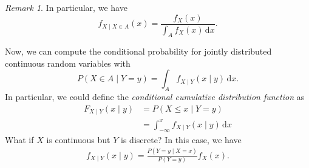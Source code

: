 \documentclass[math]{amznotes}
\theoremstyle{remark}
\newtheorem*{remark}{Remark}
\newcommand{\0}{\mathbf{0}}
\newcommand{\1}{\mathbf{1}}
\begin{document}
\begin{notebox}
    \begin{remark}
        In particular, we have
        \begin{equation*}
            f_{X \mid X \in A}(x) = \frac{f_X(x)}{\int_A\!f_X(x)\,\mathrm{d}x}.
        \end{equation*}
    \end{remark}
\end{notebox}
Now, we can compute the conditional probability for jointly distributed continuous random variables with
\begin{equation*}
    P(X \in A \mid Y = y) = \int_{A}\!f_{X \mid Y}(x \mid y)\,\mathrm{d}x.
\end{equation*}
In particular, we could define the \textit{conditional cumulative distribution function} as
\begin{align*}
    F_{X \mid Y}(x \mid y) & = P(X \leq x \mid Y = y) \\
    & = \int_{-\infty}^x\!f_{X \mid Y}(x \mid y)\,\mathrm{d}x
\end{align*}
What if $X$ is continuous but $Y$ is discrete? In this case, we have
\begin{align*}
    f_{X \mid Y}(x \mid y) = \frac{P(Y = y \mid X = x)}{P(Y = y)}f_X(x).
\end{align*}
\end{document}
